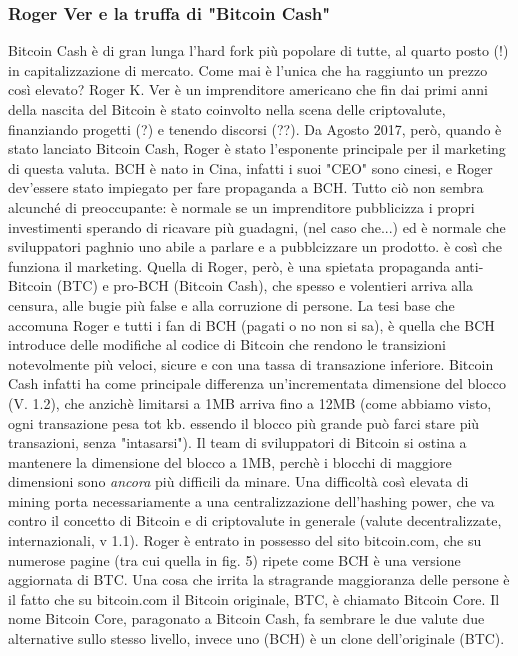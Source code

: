 \documentclass {article}
\begin{document}
{\subsubsection {Roger Ver e la truffa di "Bitcoin Cash"}


Bitcoin Cash è di gran lunga l'hard fork più popolare di tutte, al quarto posto (!) in capitalizzazione di mercato. Come mai è l'unica che ha raggiunto un prezzo così elevato?
Roger K. Ver è un imprenditore americano che fin dai primi anni della nascita del Bitcoin è stato coinvolto nella scena delle criptovalute, finanziando progetti (?) e tenendo discorsi (??).
Da Agosto 2017, però, quando è stato lanciato Bitcoin Cash, Roger è stato l'esponente principale per il marketing di questa valuta. BCH è nato in Cina, infatti i suoi "CEO" sono cinesi, e Roger dev'essere stato impiegato per fare propaganda a BCH.
Tutto ciò non sembra alcunché di preoccupante: è normale se un imprenditore pubblicizza i propri investimenti sperando di ricavare più guadagni, (nel caso che...) ed è normale che sviluppatori paghnio uno abile a parlare e a pubblcizzare un prodotto.
è così che funziona il marketing.
Quella di Roger, però, è una spietata propaganda anti-Bitcoin (BTC) e pro-BCH (Bitcoin Cash), che spesso e volentieri arriva alla censura, alle bugie più false e alla corruzione di persone.
La tesi base che accomuna Roger e tutti i fan di BCH (pagati o no non si sa), è quella che BCH introduce delle modifiche al codice di Bitcoin che rendono le transizioni notevolmente più veloci, sicure e con una tassa di transazione inferiore. Bitcoin Cash infatti ha come principale differenza un'incrementata dimensione del blocco (V. 1.2), che anzichè limitarsi a 1MB arriva fino a 12MB (come abbiamo visto, ogni transazione pesa tot kb. essendo il blocco più grande può farci stare più transazioni, senza "intasarsi").
Il team di sviluppatori di Bitcoin si ostina a mantenere la dimensione del blocco a 1MB, perchè i blocchi di maggiore dimensioni sono \emph{ancora} più difficili da minare.
Una difficoltà così elevata di mining porta necessariamente a una centralizzazione dell'hashing power, che va contro il concetto di Bitcoin e di criptovalute in generale (valute decentralizzate, internazionali, v 1.1).
Roger è entrato in possesso del sito bitcoin.com, che su numerose pagine (tra cui quella in fig. 5) ripete come BCH è una versione aggiornata di BTC. Una cosa che irrita la stragrande maggioranza delle persone è il fatto che su bitcoin.com il Bitcoin originale, BTC, è chiamato Bitcoin Core.
Il nome Bitcoin Core, paragonato a Bitcoin Cash, fa sembrare le due valute due alternative sullo stesso livello, invece uno (BCH) è un clone dell'originale (BTC).
}
\end{document}
